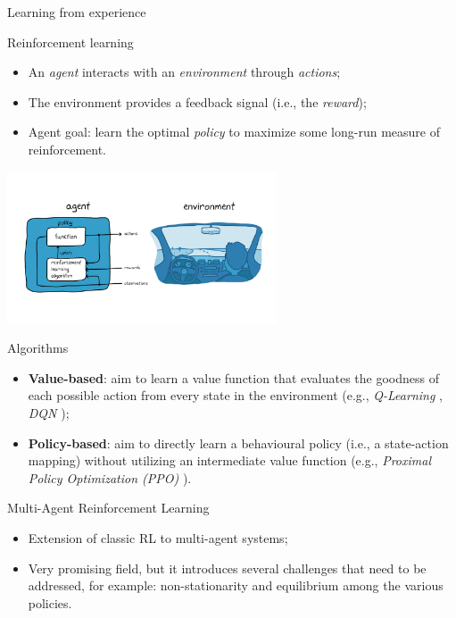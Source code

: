 \documentclass[presentation]{beamer}\mode<presentation>{\usetheme{AMSBolognaFC}}
\begin{document}
\begin{frame}[allowframebreaks]{Learning from experience}
\begin{block}{Reinforcement learning}
	\begin{itemize}
		\item An \emph{agent} interacts with an \emph{environment} through \emph{actions};
		\item The environment provides a feedback signal (i.e., the \emph{reward});
		\item Agent goal: learn the optimal \emph{policy} to maximize some long-run measure of reinforcement.
	\end{itemize}
\end{block}

\centering
\includegraphics[width=0.6\textwidth]{img/rl.png}

\begin{alertblock}{Algorithms}
	\begin{itemize}
		\item \textbf{Value-based}: aim to learn a value function that evaluates the goodness of each possible action from every 
				state in the environment (e.g., \emph{Q-Learning} \cite{dayan1992q}, \emph{DQN} \cite{mnih2013playing});
		\item \textbf{Policy-based}: aim to directly learn a behavioural policy (i.e., a state-action mapping) without
			utilizing an intermediate value function (e.g., \emph{Proximal Policy Optimization (PPO)} \cite{schulman2017proximal}).
	\end{itemize}
\end{alertblock}

\begin{alertblock}{Multi-Agent Reinforcement Learning}
	\begin{itemize}
		\item Extension of classic RL to multi-agent systems;
		\item Very promising field, but it introduces several challenges that need to be addressed, for example:
			 non-stationarity and equilibrium among the various policies.
	\end{itemize}
\end{alertblock}


\end{frame}
\end{document}
